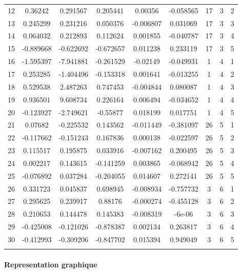 \documentclass[11pt,]{article}
\let\oldparagraph\paragraph
\renewcommand{\paragraph}[1]{\oldparagraph{#1}\mbox{}}
\begin{document}
\begin{table}[!htbp]
\begin{tabular}{@{\extracolsep{5pt}} ccccccccc}
12 & 0.36242 & 0.291567 & 0.205441 & 0.00356 & -0.058565 & 17 & 3 & 2 \\ 
13 & 0.245299 & 0.231216 & 0.050376 & -0.006807 & 0.031069 & 17 & 3 & 3 \\ 
14 & 0.064032 & 0.212893 & 0.112624 & 0.001855 & -0.040787 & 17 & 3 & 4 \\ 
15 & -0.889668 & -0.622692 & -0.672657 & 0.011238 & 0.233119 & 17 & 3 & 5 \\ 
16 & -1.595397 & -7.941881 & -0.261529 & -0.02149 & -0.049931 & 1 & 4 & 1 \\ 
17 & 0.253285 & -1.404496 & -0.153318 & 0.001641 & -0.013255 & 1 & 4 & 2 \\ 
18 & 0.529538 & 2.487263 & 0.747453 & -0.004844 & 0.080087 & 1 & 4 & 3 \\ 
19 & 0.936501 & 9.608734 & 0.226164 & 0.006494 & -0.034652 & 1 & 4 & 4 \\ 
20 & -0.123927 & -2.749621 & -0.55877 & 0.018199 & 0.017751 & 1 & 4 & 5 \\ 
21 & 0.07682 & -0.225532 & 0.143562 & -0.011449 & -0.381097 & 26 & 5 & 1 \\ 
22 & -0.117662 & -0.151243 & 0.167836 & 0.000138 & -0.022597 & 26 & 5 & 2 \\ 
23 & 0.115517 & 0.195875 & 0.033916 & -0.007162 & 0.200495 & 26 & 5 & 3 \\ 
24 & 0.002217 & 0.143615 & -0.141259 & 0.003865 & -0.068942 & 26 & 5 & 4 \\ 
25 & -0.076892 & 0.037284 & -0.204055 & 0.014607 & 0.272141 & 26 & 5 & 5 \\ 
26 & 0.331723 & 0.045837 & 0.698945 & -0.008934 & -0.757732 & 3 & 6 & 1 \\ 
27 & 0.295625 & 0.239917 & 0.88176 & -0.000274 & -0.455128 & 3 & 6 & 2 \\ 
28 & 0.210653 & 0.144478 & 0.145383 & -0.008319 & -6e-06 & 3 & 6 & 3 \\ 
29 & -0.425008 & -0.121026 & -0.878387 & 0.002134 & 0.263817 & 3 & 6 & 4 \\ 
30 & -0.412993 & -0.309206 & -0.847702 & 0.015394 & 0.949049 & 3 & 6 & 5 \\ 
\hline \\[-1.8ex] 
\end{tabular} 
\end{table}

\FloatBarrier

\hypertarget{representation-graphique}{%
\paragraph{Representation graphique}\label{representation-graphique}}
\end{document}
